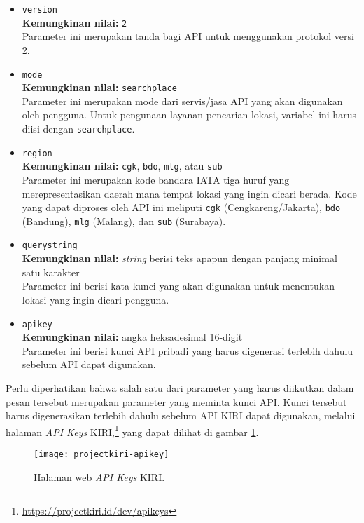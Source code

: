 \begin{itemize}
	\item \verb|version|\\
	\textbf{Kemungkinan nilai:} \verb|2|\\
	Parameter ini merupakan tanda bagi API untuk menggunakan protokol versi 2.
	\item \verb|mode|\\
	\textbf{Kemungkinan nilai:} \verb|searchplace|\\
	Parameter ini merupakan mode dari servis/jasa API yang akan digunakan oleh pengguna. Untuk pengunaan layanan pencarian lokasi, variabel ini harus diisi dengan \verb|searchplace|.
	\item \verb|region|\\
	\textbf{Kemungkinan nilai:} \verb|cgk|, \verb|bdo|, \verb|mlg|, atau \verb|sub|\\
	Parameter ini merupakan kode bandara IATA tiga huruf yang merepresentasikan daerah mana tempat lokasi yang ingin dicari berada. Kode yang dapat diproses oleh API ini meliputi \verb|cgk| (Cengkareng/Jakarta), \verb|bdo| (Bandung), \verb|mlg| (Malang), dan \verb|sub| (Surabaya).
	\newpage %
	\item \verb|querystring|\\
	\textbf{Kemungkinan nilai:} \textit{string} berisi teks apapun dengan panjang minimal satu karakter\\
	Parameter ini berisi kata kunci yang akan digunakan untuk menentukan lokasi yang ingin dicari pengguna.
	\item \verb|apikey|\\
	\textbf{Kemungkinan nilai:} angka heksadesimal 16-digit\\
	Parameter ini berisi kunci API pribadi yang harus digenerasi terlebih dahulu sebelum API dapat digunakan.
\end{itemize}
\vspace{\baselineskip}
Perlu diperhatikan bahwa salah satu dari parameter yang harus diikutkan dalam pesan tersebut merupakan parameter yang meminta kunci API. Kunci tersebut harus digenerasikan terlebih dahulu sebelum API KIRI dapat digunakan, melalui halaman \textit{API Keys} KIRI,\footnote{\href{https://projectkiri.id/dev/apikeys}{https://projectkiri.id/dev/apikeys}} yang dapat dilihat di gambar \ref{fig:kiri-apikeypage}.

\begin{figure}[t]
    \centering
    \texttt{[image: projectkiri-apikey]}
    \caption[Halaman web \textit{API Keys} KIRI.]{Halaman web \textit{API Keys} KIRI.}
    \label{fig:kiri-apikeypage}
\end{figure}

